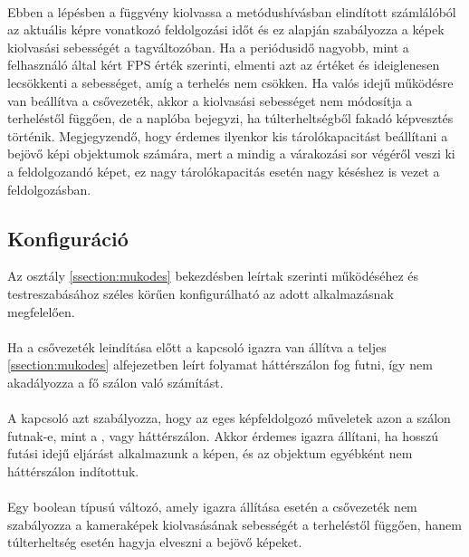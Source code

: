 \paragraph{} Ebben a lépésben a függvény kiolvassa a  metódushívásban elindított számlálóból az aktuális képre vonatkozó feldolgozási időt és ez alapján szabályozza a képek kiolvasási sebességét a  tagváltozóban. Ha a periódusidő nagyobb, mint a felhasználó által kért FPS érték szerinti, elmenti azt az értéket és ideiglenesen lecsökkenti a sebességet, amíg a terhelés nem csökken. Ha valós idejű működésre van beállítva a csővezeték, akkor a kiolvasási sebességet nem módosítja a terheléstől függően, de a naplóba bejegyzi, ha túlterheltségből fakadó képvesztés történik. Megjegyzendő, hogy érdemes ilyenkor kis tárolókapacitást beállítani a bejövő képi objektumok számára, mert a  mindig a várakozási sor végéről veszi ki a feldolgozandó képet, ez nagy tárolókapacitás esetén nagy késéshez is vezet a feldolgozásban.

\subsection{Konfiguráció}

Az osztály \ref{ssection:mukodes} bekezdésben leírtak szerinti működéséhez és testreszabásához széles körűen konfigurálható az adott alkalmazásnak megfelelően.

\paragraph{} Ha a csővezeték leindítása előtt a kapcsoló igazra van állítva a teljes \ref{ssection:mukodes} alfejezetben leírt folyamat háttérszálon fog futni, így nem akadályozza a fő szálon való számítást.

\paragraph{} A kapcsoló azt szabályozza, hogy az eges képfeldolgozó műveletek azon a szálon futnak-e, mint a , vagy háttérszálon. Akkor érdemes igazra állítani, ha hosszú futási idejű eljárást alkalmazunk a képen, és az objektum egyébként nem háttérszálon indítottuk.

\paragraph{} Egy boolean típusú változó, amely igazra állítása esetén a csővezeték nem szabályozza a kameraképek kiolvasásának sebességét a terheléstől függően, hanem túlterheltség esetén hagyja elveszni a bejövő képeket.

